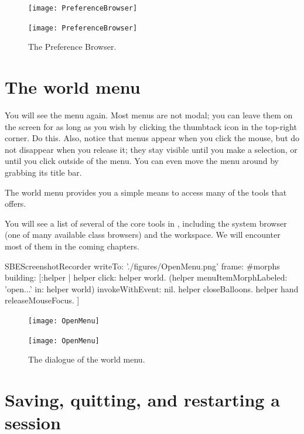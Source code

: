 \documentclass[a4paper,10pt,twoside]{book}
\begin{document}
\begin{figure}[htb]
\ifluluelse
	{\centerline {\texttt{[image: PreferenceBrowser]}}}
	{\centerline {\texttt{[image: PreferenceBrowser]}}}
\caption{The Preference Browser.\label{fig:prefBrowser}}
\end{figure}

\section{The world menu}

You will see the  menu again.
Most \sq menus are not modal; you can leave them on the screen for as long as you wish by clicking the thumbtack icon in the top-right corner.
Do this.
Also, notice that menus appear when you click the mouse, but do not disappear when you release it; they stay visible until you make a selection, or until you click outside of the menu.
You can even move the menu around by grabbing its title bar.

The world menu provides you a simple means to access many of the tools that \sq offers.

You will see a list of several of the core tools in \sq, including the system browser (one of many available class browsers) and the workspace.
We will encounter most of them in the coming chapters.

\begin{ExecuteSmalltalkScript}
SBEScreenshotRecorder writeTo: './figures/OpenMenu.png' frame: #morphs building: [:helper |
  helper click: helper world.
  (helper menuItemMorphLabeled: 'open...' in: helper world) invokeWithEvent: nil.
  helper closeBalloons.
  helper hand releaseMouseFocus.
]
\end{ExecuteSmalltalkScript}

\begin{figure}[htb]
\ifluluelse
	{\centerline {\texttt{[image: OpenMenu]}}}
	{\centerline {\texttt{[image: OpenMenu]}}}
\caption{The  dialogue of the world menu.\label{fig:openmenu}}
\end{figure}

\section{Saving, quitting, and restarting a \sq session}
\end{document}
